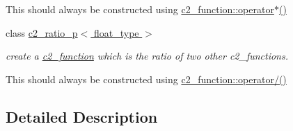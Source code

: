 \begin{DoxyCompactItemize}
\begin{DoxyCompactList}
This should always be constructed using \hyperlink{classc2__function_a7744675c98a8ec63320ac1c0b61bec9c}{c2\+\_\+function\+::operator$\ast$()} \end{DoxyCompactList}\item 
class \hyperlink{classc2__ratio__p}{c2\+\_\+ratio\+\_\+p$<$ float\+\_\+type $>$}
\begin{DoxyCompactList}\small\item\em create a \hyperlink{classc2__function}{c2\+\_\+function} which is the ratio of two other c2\+\_\+functions.

This should always be constructed using \hyperlink{classc2__function_a93ac28dfe5daebea84d147b8e346e60c}{c2\+\_\+function\+::operator/()} \end{DoxyCompactList}\end{DoxyCompactItemize}


\subsection{Detailed Description}
